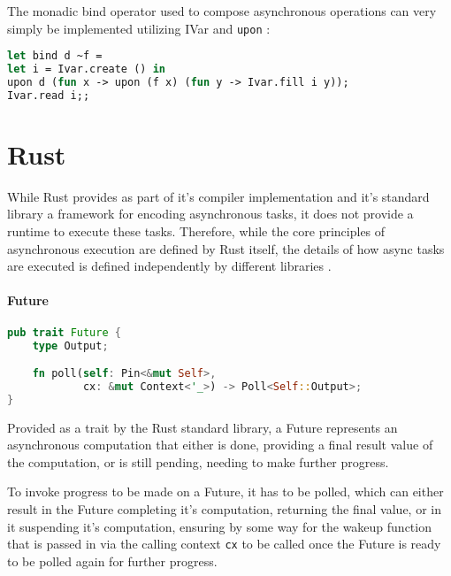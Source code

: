 \documentclass[a4paper,UKenglish,cleveref, autoref, thm-restate]{lipics-v2021}
\begin{document}
The monadic bind operator used to compose asynchronous operations can very simply be implemented utilizing IVar and \lstinline{upon} \cite{Concurre6:online}:

\begin{minipage}{\linewidth}
\begin{lstlisting}[language=Caml,caption={Implementation of bind},captionpos=t]
let bind d ~f =
let i = Ivar.create () in
upon d (fun x -> upon (f x) (fun y -> Ivar.fill i y));
Ivar.read i;;
\end{lstlisting}
\end{minipage}

\section{Rust}
\label{sec:rust}

While Rust provides as part of it's compiler implementation and it's standard library a framework for encoding asynchronous tasks, it does not provide a runtime to execute these tasks. Therefore, while the core principles of asynchronous execution are defined by Rust itself, the details of how async tasks are executed is defined independently by different libraries \cite{TheAsync92:online}.

\paragraph*{Future}

\begin{minipage}{\linewidth}
\begin{lstlisting}[language=Rust,caption={Definition of Future},captionpos=t]
pub trait Future {
    type Output;

    fn poll(self: Pin<&mut Self>,
            cx: &mut Context<'_>) -> Poll<Self::Output>;
}
\end{lstlisting}
\end{minipage}

Provided as a trait by the Rust standard library, a Future represents an asynchronous computation that either is done, providing a final result value of the computation, or is still pending, needing to make further progress.

To invoke progress to be made on a Future, it has to be polled, which can either result in the Future completing it's computation, returning the final value, or in it suspending it's computation, ensuring by some way for the wakeup function that is passed in via the calling context \lstinline{cx} to be called once the Future is ready to be polled again for further progress.
\end{document}
